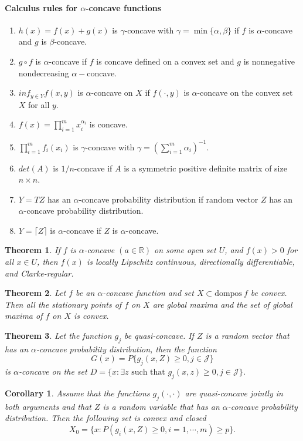 \documentclass[a4pper,11pt]{article}
\newtheorem{thm}{Theorem}[section]
\newtheorem{corollary}{Corollary}[section]
\begin{document}
\paragraph{Calculus rules for $\alpha$-concave functions}
\begin{enumerate}
    \item $h(x)=f(x)+g(x)$ is $\gamma$-concave with $\gamma=\min\{\alpha,\beta\}$ if $f$ is $\alpha$-concave and $g$ is $\beta$-concave.
    \item $g\circ f$ is $\alpha$-concave if $f$ is concave defined on a convex set and $g$ is nonnegative nondecreasing $\alpha-$concave.
    \item $inf_{y\in Y}f(x,y)$ is $\alpha$-concave on $X$ if $f(\cdot,y)$ is $\alpha$-concave on the convex set $X$ for all $y$.
    \item $f(x)=\prod_{i=1}^m x_i^{\alpha_i}$ is concave.
    \item $\prod_{i=1}^m f_i(x_i)$ is $\gamma$-concave with $\gamma=(\sum_{i=1}^m\alpha_i)^{-1}$.
    \item $det(A)$ is $1/n$-concave if $A$ is a symmetric positive deﬁnite matrix of size $n\times n$.
    \item $Y=TZ$ has an $\alpha$-concave probability distribution if random vector $Z$ has an $\alpha$-concave probability distribution.
    \item $Y=\lceil Z\rceil$ is $\alpha$-concave if $Z$ is $\alpha$-concave.
\end{enumerate}
\begin{thm}
    If $f$ is $\alpha$-concave $(a\in \mathbb R)$ on some open set $U$, and $f(x)>0$ for all $x\in U$, then $f(x)$ is locally Lipschitz continuous, directionally differentiable, and Clarke-regular.
\end{thm}
\begin{thm}
    Let $f$ be an $\alpha$-concave function and set $X\subset \text{dompos} \ f$ be convex. Then all the stationary points of $f$ on $X$ are global maxima and the set of global maxima of $f$ on $X$ is convex.
\end{thm}

\begin{thm}
    Let the function $g_j$ be quasi-concave. If $Z$ is a random vector that has an $\alpha$-concave probability distribution, then the function
    $$G(x)=P\{g_j(x,Z)\geq 0,j\in \mathcal J\}$$
    is $\alpha$-concave on the set $D=\{x :\exists z \text{ such that } g_j(x,z)\geq 0,j\in \mathcal J\}$.
\end{thm}
\begin{corollary} Assume that the functions $g_j(\cdot,\cdot)$ are quasi-concave jointly in both arguments and that $Z$ is a random variable that has an $\alpha$-concave probability distribution. Then the following set is convex and closed
    $$X_0=\{x: P(g_i(x,Z) \geq 0, i=1,\cdots,m) \geq p\}.$$
\end{corollary}
\end{document}
